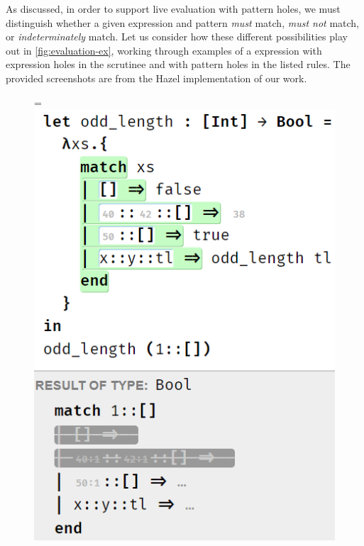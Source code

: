 As discussed, in order to support live evaluation with pattern holes, we must distinguish whether a given expression and pattern \emph{must} match, \emph{must not} match, or \emph{indeterminately} match. Let us consider how these different possibilities play out in \autoref{fig:evaluation-ex}, working through examples of a  expression with expression holes in the scrutinee and with pattern holes in the listed rules. The provided screenshots are from the Hazel implementation of our work.
\begin{figure}
	\centering
	=\hbox{\includegraphics[scale=0.47]{imgs/pat_match_pat_holes.png}}%
\end{figure}
